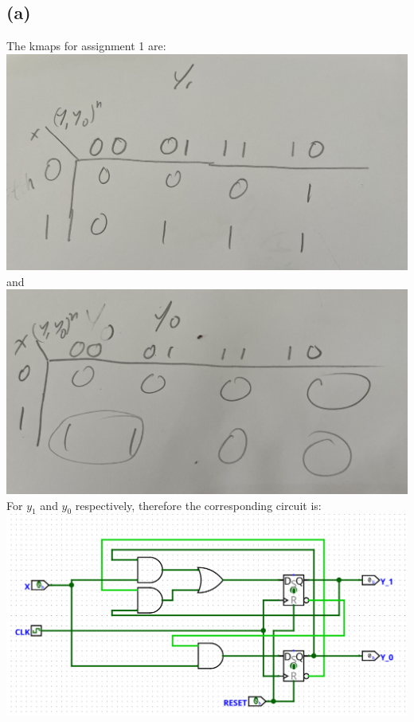 \documentclass[12pt]{article}
\begin{document}
\subsection*{(a)}
The kmaps for assignment 1 are:\\
\includegraphics[scale=0.1]{Q3A1Y1.jpg}\\
and\\
\includegraphics[scale=0.1]{Q3A1Y0.jpg}\\
For $y_1$ and $y_0$ respectively, therefore the corresponding circuit is:\\
\includegraphics[scale=0.3]{Q3circuit1.png}\\
\end{document}
